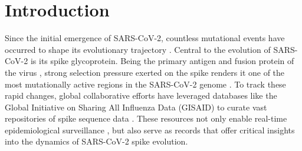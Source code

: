 \documentclass[%
 reprint,
superscriptaddress,
 amsmath,amssymb,
 aps,
]{revtex4-2}
\begin{document}

\section{Introduction}\label{sec:Introduction}


Since the initial emergence of SARS-CoV-2, countless mutational events have occurred to shape its evolutionary trajectory \cite{10.1038/s41579-023-00878-2}. Central to the evolution of SARS-CoV-2 is its spike glycoprotein. Being the primary antigen and fusion protein of the virus \cite{Walls2020, huang_structural_2020}, strong selection pressure exerted on the spike renders it one of the most mutationally active regions in the SARS-CoV-2 genome \cite{10.1093/emph/eoac010, Carabelli2023NatRevMicrobiol}. To track these rapid changes, global collaborative efforts have leveraged databases like the Global Initiative on Sharing All Influenza Data (GISAID) to curate vast repositories of spike sequence data \cite{gisaid}. These resources not only enable real-time epidemiological surveillance \cite{rambaut2020dynamic}, but also serve as records that offer critical insights into the dynamics of SARS-CoV-2 spike evolution.
\end{document}
